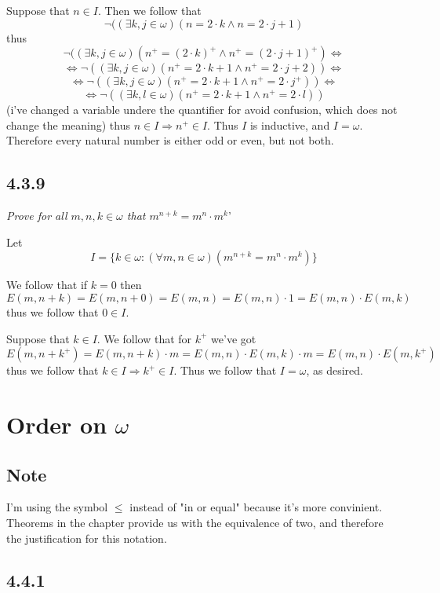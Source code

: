 \documentclass[11pt,oneside,titlepage]{book}
\DeclareMathOperator \lra {\Leftrightarrow}
\DeclareMathOperator \ra {\Rightarrow}
\begin{document}
Suppose that $n \in I$. Then we follow that
$$\neg((\exists k, j \in \omega)(n = 2 \cdot k \land n = 2 \cdot j + 1)$$
thus
$$\neg((\exists k, j \in \omega)(n^+ = (2 \cdot k)^+ \land n^+ = (2 \cdot j + 1)^+) \lra$$
$$\lra \neg((\exists k, j \in \omega)(n^+ = 2 \cdot k + 1 \land n^+ = 2 \cdot j + 2))\lra $$
$$\lra \neg((\exists k, j \in \omega)(n^+ = 2 \cdot k + 1 \land n^+ = 2 \cdot j^+))\lra$$
$$\lra \neg((\exists k, l \in \omega)(n^+ = 2 \cdot k + 1 \land n^+ = 2 \cdot l))$$
(i've changed a variable undere the quantifier for avoid confusion, which does not change the
meaning)
thus $n \in I \ra n^+ \in I$. Thus $I$ is inductive, and $I = \omega$. Therefore
every natural number is either odd or even, but not both.


\subsection*{4.3.9}

\textit{Prove for all $m, n, k \in \omega$ that $m^{n + k} = m^n \cdot m^k$}'

Let
$$I = \{k \in \omega: (\forall m, n \in \omega)(m^{n + k} = m^n \cdot m^k)\}$$

We follow that if $k = 0$ then
$$E(m, n + k) = E(m, n + 0) = E(m, n) = E(m, n) \cdot 1 = E(m, n) \cdot E(m, k)$$
thus we follow that $0 \in I$.

Suppose that $k \in I$. We follow that for $k^+$ we've got
$$E(m, n + k^+) = E(m, n + k) \cdot m = E(m, n) \cdot E(m, k) \cdot m =
E(m, n) \cdot E(m, k^+)$$
thus we follow that $k \in I \ra k^+ \in I$. Thus we follow that $I = \omega$, as desired.


\section{Order on $\omega$}

\subsection*{Note}

I'm using the symbol $\leq$ instead of "in or equal" because it's more convinient.
Theorems in the chapter provide us with the equivalence of two, and therefore the justification
for this notation.

\subsection*{4.4.1}
\end{document}
